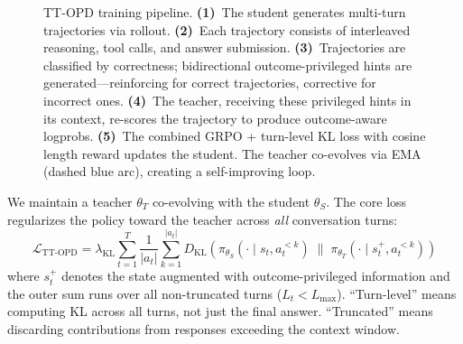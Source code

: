 \documentclass{article}
\begin{document}
\begin{figure}[t]
{%
}%
\caption{TT-OPD training pipeline. \textbf{(1)}~The student generates multi-turn trajectories via rollout. \textbf{(2)}~Each trajectory consists of interleaved reasoning, tool calls, and answer submission. \textbf{(3)}~Trajectories are classified by correctness; bidirectional outcome-privileged hints are generated---reinforcing for correct trajectories, corrective for incorrect ones. \textbf{(4)}~The teacher, receiving these privileged hints in its context, re-scores the trajectory to produce outcome-aware logprobs. \textbf{(5)}~The combined GRPO + turn-level KL loss with cosine length reward updates the student. The teacher co-evolves via EMA (dashed blue arc), creating a self-improving loop.}
\label{fig:ttopd}
\end{figure}

We maintain a teacher $\theta_T$ co-evolving with the student $\theta_S$. The core loss regularizes the policy toward the teacher across \emph{all} conversation turns:
\begin{equation}
    \mathcal{L}_{\text{TT-OPD}} = \lambda_{\text{KL}} \sum_{t=1}^{T} \frac{1}{|a_t|} \sum_{k=1}^{|a_t|} D_{\text{KL}}\!\left(\pi_{\theta_S}(\cdot \mid s_t, a_t^{<k}) \;\|\; \pi_{\theta_T}(\cdot \mid s_t^{+}, a_t^{<k})\right)
\end{equation}
where $s_t^{+}$ denotes the state augmented with outcome-privileged information and the outer sum runs over all non-truncated turns ($L_t < L_{\max}$). ``Turn-level'' means computing KL across all turns, not just the final answer. ``Truncated'' means discarding contributions from responses exceeding the context window.
\end{document}

